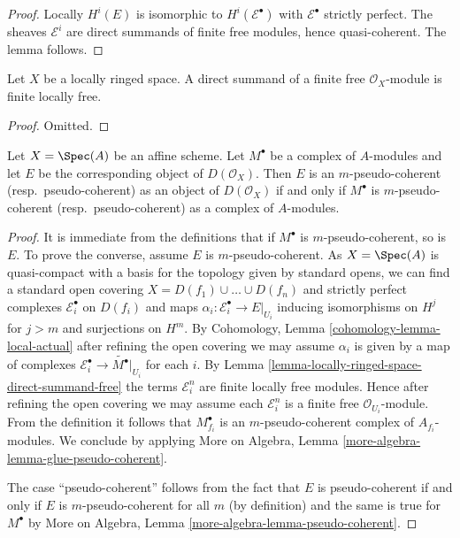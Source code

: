 \begin{proof}
Locally $H^i(E)$ is isomorphic to $H^i(\mathcal{E}^\bullet)$
with $\mathcal{E}^\bullet$ strictly perfect. The sheaves
$\mathcal{E}^i$ are direct summands of finite free modules,
hence quasi-coherent. The lemma follows.
\end{proof}

\begin{lemma}
\label{lemma-locally-ringed-space-direct-summand-free}
Let $X$ be a locally ringed space. A direct summand of a finite free
$\mathcal{O}_X$-module is finite locally free.
\end{lemma}

\begin{proof}
Omitted.
\end{proof}

\begin{lemma}
\label{lemma-pseudo-coherent-affine}
Let $X = \Spec(A)$ be an affine scheme. Let $M^\bullet$ be a
complex of $A$-modules and let $E$ be the corresponding object
of $D(\mathcal{O}_X)$. Then $E$ is an $m$-pseudo-coherent
(resp.\ pseudo-coherent) as an object of $D(\mathcal{O}_X)$
if and only if $M^\bullet$ is $m$-pseudo-coherent (resp.\ pseudo-coherent)
as a complex of $A$-modules.
\end{lemma}

\begin{proof}
It is immediate from the definitions that if $M^\bullet$ is
$m$-pseudo-coherent, so is $E$. To prove the converse, assume
$E$ is $m$-pseudo-coherent. As $X = \Spec(A)$ is quasi-compact with
a basis for the topology given by standard opens, we can find a standard
open covering $X = D(f_1) \cup \ldots \cup D(f_n)$ and strictly
perfect complexes $\mathcal{E}_i^\bullet$ on $D(f_i)$ and
maps $\alpha_i : \mathcal{E}_i^\bullet \to E|_{U_i}$ inducing
isomorphisms on $H^j$ for $j > m$ and surjections on $H^m$.
By Cohomology, Lemma \ref{cohomology-lemma-local-actual}
after refining the open covering
we may assume $\alpha_i$ is given by a map of complexes
$\mathcal{E}_i^\bullet \to \widetilde{M^\bullet}|_{U_i}$
for each $i$. By Lemma \ref{lemma-locally-ringed-space-direct-summand-free}
the terms $\mathcal{E}_i^n$ are finite locally free modules.
Hence after refining the open covering we may assume each
$\mathcal{E}_i^n$ is a finite free $\mathcal{O}_{U_i}$-module.
From the definition it follows that $M^\bullet_{f_i}$ is
an $m$-pseudo-coherent complex of $A_{f_i}$-modules.
We conclude by applying
More on Algebra, Lemma \ref{more-algebra-lemma-glue-pseudo-coherent}.

\medskip\noindent
The case ``pseudo-coherent'' follows from the fact that $E$ is
pseudo-coherent if and only if $E$ is $m$-pseudo-coherent for
all $m$ (by definition) and the same is true for $M^\bullet$
by More on Algebra, Lemma \ref{more-algebra-lemma-pseudo-coherent}.
\end{proof}

